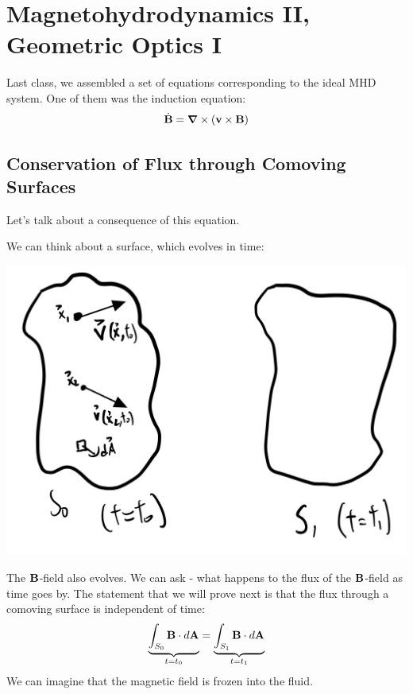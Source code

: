 \section{Magnetohydrodynamics II, Geometric Optics I}

Last class, we assembled a set of equations corresponding to the ideal MHD system. One of them was the induction equation:
\begin{equation}
    \dot{\v{B}} = \nabla \times(\v{v} \times \v{B})
\end{equation}

\subsection{Conservation of Flux through Comoving Surfaces}
Let's talk about a consequence of this equation.

We can think about a surface, which evolves in time:

\begin{center}
    \includegraphics[scale=0.35]{Lectures/Images/lec16-twosurfaces.png}
\end{center}

The $\mathbf{B}$-field also evolves. We can ask - what happens to the flux of the $\mathbf{B}$-field as time goes by. The statement that we will prove next is that the flux through a comoving surface is independent of time:
\begin{equation}
    \underbrace{\int_{S_0}\mathbf{B} \cdot d\mathbf{A}}_{t=t_0} = \underbrace{\int_{S_1}\mathbf{B} \cdot d\mathbf{A}}_{t=t_1}
\end{equation}
We can imagine that the magnetic field is frozen into the fluid.


